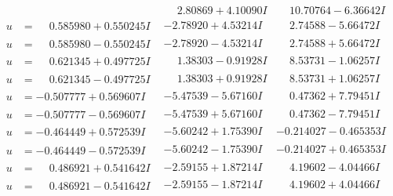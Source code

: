 \documentclass[1p]{elsarticle_modified}
\theoremstyle{definition}
\begin{document}
$$\begin{array}{c|c|c}
 & \phantom{-}2.80869 + 4.10090 I & \phantom{-}10.70764 - 6.36642 I \\ \hline\begin{aligned}
u &= \phantom{-}0.585980 + 0.550245 I\end{aligned}
 & -2.78920 + 4.53214 I & \phantom{-}2.74588 - 5.66472 I \\ \hline\begin{aligned}
u &= \phantom{-}0.585980 - 0.550245 I\end{aligned}
 & -2.78920 - 4.53214 I & \phantom{-}2.74588 + 5.66472 I \\ \hline\begin{aligned}
u &= \phantom{-}0.621345 + 0.497725 I\end{aligned}
 & \phantom{-}1.38303 - 0.91928 I & \phantom{-}8.53731 - 1.06257 I \\ \hline\begin{aligned}
u &= \phantom{-}0.621345 - 0.497725 I\end{aligned}
 & \phantom{-}1.38303 + 0.91928 I & \phantom{-}8.53731 + 1.06257 I \\ \hline\begin{aligned}
u &= -0.507777 + 0.569607 I\end{aligned}
 & -5.47539 - 5.67160 I & \phantom{-}0.47362 + 7.79451 I \\ \hline\begin{aligned}
u &= -0.507777 - 0.569607 I\end{aligned}
 & -5.47539 + 5.67160 I & \phantom{-}0.47362 - 7.79451 I \\ \hline\begin{aligned}
u &= -0.464449 + 0.572539 I\end{aligned}
 & -5.60242 + 1.75390 I & -0.214027 - 0.465353 I \\ \hline\begin{aligned}
u &= -0.464449 - 0.572539 I\end{aligned}
 & -5.60242 - 1.75390 I & -0.214027 + 0.465353 I \\ \hline\begin{aligned}
u &= \phantom{-}0.486921 + 0.541642 I\end{aligned}
 & -2.59155 + 1.87214 I & \phantom{-}4.19602 - 4.04466 I \\ \hline\begin{aligned}
u &= \phantom{-}0.486921 - 0.541642 I\end{aligned}
 & -2.59155 - 1.87214 I & \phantom{-}4.19602 + 4.04466 I \\ \hline\begin{aligned}

\end{aligned}
\end{array}$$
\end{document}
